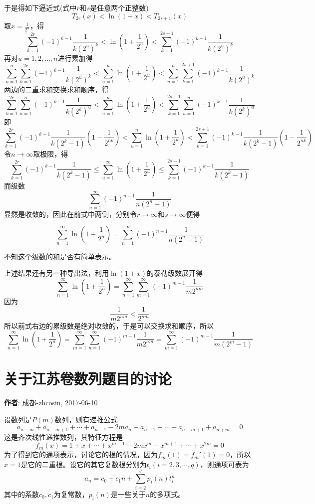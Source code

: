 \documentclass{ctexart}
\begin{document}
于是得如下逼近式(式中$r$和$s$是任意两个正整数)
\[ T_{2r}(x) < \ln{(1+x)} < T_{2s+1}(x) \]
取$x=\frac{1}{2^u}$，得
\[ \sum_{k=1}^{2r} (-1)^{k-1} \frac{1}{k(2^u)^k} < \ln{\left( 1+\frac{1}{2^u} \right) < \sum_{k=1}^{2s+1} (-1)^{k-1} \frac{1}{k(2^u)^k}} \]
再对$u=1,2,\ldots,n$进行累加得
\[ \sum_{u=1}^n \sum_{k=1}^{2r} (-1)^{k-1} \frac{1}{k(2^u)^k} < \sum_{u=1}^n \ln{\left( 1+\frac{1}{2^u} \right) < \sum_{u=1}^{n} \sum_{k=1}^{2s+1} (-1)^{k-1} \frac{1}{k(2^u)^k}} \]
两边的二重求和交换求和顺序，得
\[  \sum_{k=1}^{2r} \sum_{u=1}^n (-1)^{k-1} \frac{1}{k(2^k)^u} < \sum_{u=1}^n \ln{\left( 1+\frac{1}{2^u} \right) <  \sum_{k=1}^{2s+1} \sum_{u=1}^{n}(-1)^{k-1} \frac{1}{k(2^k)^u}} \]
即
\[ \sum_{k=1}^{2r} (-1)^{k-1} \frac{1}{k(2^k-1)} \left( 1-\frac{1}{2^{nk}} \right) < \sum_{u=1}^n \ln{\left( 1+\frac{1}{2^u} \right)} < \sum_{k=1}^{2s+1} (-1)^{k-1} \frac{1}{k(2^k-1)} \left( 1-\frac{1}{2^{nk}} \right)\]
令$n\to\infty$取极限，得
\[ \sum_{k=1}^{2r} (-1)^{k-1} \frac{1}{k(2^k-1)} \leqslant \sum_{u=1}^{\infty} \ln{\left( 1+\frac{1}{2^u} \right)} \leqslant \sum_{k=1}^{2s+1} (-1)^{k-1} \frac{1}{k(2^k-1)} \]
而级数
\[ \sum_{n=1}^{\infty} (-1)^{n-1} \frac{1}{n(2^n-1)} \]
显然是收敛的，因此在前式中两侧，分别令$r \to \infty$和$s \to \infty$便得
\begin{statement}
\[ \sum_{n=1}^{\infty} \ln{\left( 1+\frac{1}{2^n} \right)} = \sum_{n=1}^{\infty} (-1)^{n-1} \frac{1}{n(2^n-1)} \]
\end{statement}
不知这个级数的和是否有简单表示。

上述结果还有另一种导出法，利用$\ln{(1+x)}$的泰勒级数展开得
\[ \sum_{n=1}^{\infty} \ln{\left( 1+\frac{1}{2^n} \right)} = \sum_{n=1}^{\infty} \sum_{m=1}^{\infty} (-1)^{m-1} \frac{1}{m2^{nm}} \]
因为
\[ \frac{1}{m2^{nm}} < \frac{1}{2^{nm}} \]
所以前式右边的累级数是绝对收敛的，于是可以交换求和顺序，所以
\[ \sum_{n=1}^{\infty} \ln{\left( 1+\frac{1}{2^n} \right)} =  \sum_{m=1}^{\infty} \sum_{n=1}^{\infty}(-1)^{m-1} \frac{1}{m2^{nm}} = \sum_{m=1}^{\infty} (-1)^{m-1}\frac{1}{m(2^m-1)} \]

\section{关于江苏卷数列题目的讨论}
\label{sec:jiangshu-series-extend}

\textbf{作者}: 成都-zhcosin, 2017-06-10

  设数列是$P(m)$数列，则有递推公式
  \[ a_{n-m}+a_{n-m+1}+\cdots+a_{n-1}-2ma_n+a_{n+1}+\cdots+a_{n-m+1}+a_{n+m}=0 \]
  这是齐次线性递推数列，其特征方程是
  \[ f_m(x) = 1+x+\cdots+x^{m-1}-2mx^m+x^{m+1}+\cdots+x^{2m}=0 \]
  为了得到它的通项表示，讨论它的根的情况，因为$f_m(1)=f_m'(1)=0$，所以$x=1$是它的二重根。设它的其它复数根分别为$t_i(i=2,3,\cdots,q)$，则通项可表为
  \[ a_n=c_0+c_1 n + \sum_{i=2}^q p_i(n)t_i^n \]
  其中的系数$c_0,c_1$为复常数，$p_i(n)$是一些关于$n$的多项式。
\end{document}
